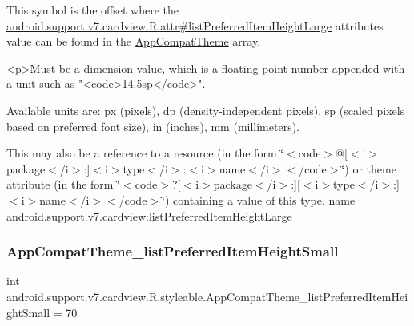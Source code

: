 This symbol is the offset where the \hyperlink{classandroid_1_1support_1_1v7_1_1cardview_1_1R_1_1attr_a8fc05e30e3bec2d22a56a586b5306a3b}{android.\+support.\+v7.\+cardview.\+R.\+attr\#list\+Preferred\+Item\+Height\+Large} attribute\textquotesingle{}s value can be found in the \hyperlink{classandroid_1_1support_1_1v7_1_1cardview_1_1R_1_1styleable_a52e6f69f954ecc2622d72c0b4d298938}{App\+Compat\+Theme} array.

\begin{DoxyVerb}      <p>Must be a dimension value, which is a floating point number appended with a unit such as "<code>14.5sp</code>".
\end{DoxyVerb}
 Available units are\+: px (pixels), dp (density-\/independent pixels), sp (scaled pixels based on preferred font size), in (inches), mm (millimeters). 

This may also be a reference to a resource (in the form \char`\"{}$<$code$>$@\mbox{[}$<$i$>$package$<$/i$>$\+:\mbox{]}$<$i$>$type$<$/i$>$\+:$<$i$>$name$<$/i$>$$<$/code$>$\char`\"{}) or theme attribute (in the form \char`\"{}$<$code$>$?\mbox{[}$<$i$>$package$<$/i$>$\+:\mbox{]}\mbox{[}$<$i$>$type$<$/i$>$\+:\mbox{]}$<$i$>$name$<$/i$>$$<$/code$>$\char`\"{}) containing a value of this type.  name android.\+support.\+v7.\+cardview\+:list\+Preferred\+Item\+Height\+Large \mbox{\label{classandroid_1_1support_1_1v7_1_1cardview_1_1R_1_1styleable_a2edb3e97a83d754327dc42bd719ef9d4}} 
\subsubsection{\texorpdfstring{App\+Compat\+Theme\+\_\+list\+Preferred\+Item\+Height\+Small}{AppCompatTheme\_listPreferredItemHeightSmall}}
{\footnotesize\ttfamily int android.\+support.\+v7.\+cardview.\+R.\+styleable.\+App\+Compat\+Theme\+\_\+list\+Preferred\+Item\+Height\+Small = 70\hspace{0.3cm}{\ttfamily [static]}}

